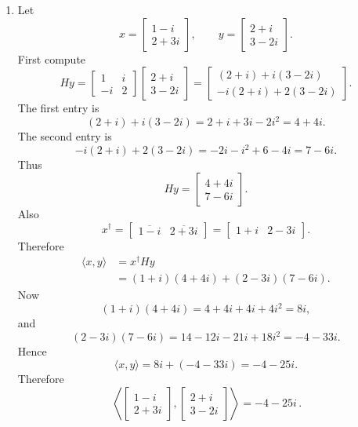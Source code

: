 \documentclass[12pt]{article}
\newcommand{\C}{\mathbb{C}}
\begin{document}
\begin{enumerate}[label=(\alph*)]
Since sesquilinearity, conjugate symmetry, and positive definiteness all hold, $\langle\cdot,\cdot\rangle$ is an inner product on $\C^{2,1}$.

\[
\boxed{\,\langle\cdot,\cdot\rangle \text{ is an inner product on }\C^{2,1}.\,}
\]

\item Let
\[
x=\begin{bmatrix}1-i\\2+3i\end{bmatrix},\qquad
 y=\begin{bmatrix}2+i\\3-2i\end{bmatrix}.
\]
First compute
\[
Hy=
\begin{bmatrix}
1&i\\
-i&2
\end{bmatrix}
\begin{bmatrix}2+i\\3-2i\end{bmatrix}
=
\begin{bmatrix}
(2+i)+i(3-2i)\\
-i(2+i)+2(3-2i)
\end{bmatrix}.
\]
The first entry is
\[
(2+i)+i(3-2i)=2+i+3i-2i^2=4+4i.
\]
The second entry is
\[
-i(2+i)+2(3-2i)=-2i-i^2+6-4i=7-6i.
\]
Thus
\[
Hy=\begin{bmatrix}4+4i\\7-6i\end{bmatrix}.
\]
Also
\[
x^\dagger=\begin{bmatrix}\overline{1-i}&\overline{2+3i}\end{bmatrix}
=\begin{bmatrix}1+i&2-3i\end{bmatrix}.
\]
Therefore
\begin{align*}
\langle x,y\rangle
&=x^\dagger Hy\\
&=(1+i)(4+4i)+(2-3i)(7-6i).
\end{align*}
Now
\[
(1+i)(4+4i)=4+4i+4i+4i^2=8i,
\]
and
\[
(2-3i)(7-6i)=14-12i-21i+18i^2=-4-33i.
\]
Hence
\[
\langle x,y\rangle=8i+(-4-33i)=-4-25i.
\]
Therefore
\[
\boxed{\,\left\langle
\begin{bmatrix}1-i\\ 2+3i\end{bmatrix},
\begin{bmatrix}2+i\\ 3-2i\end{bmatrix}
\right\rangle=-4-25i\,}.
\]
\end{enumerate}
\end{document}
